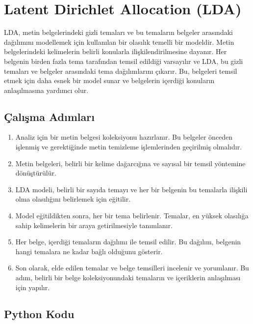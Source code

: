 \section{Latent Dirichlet Allocation (LDA)}
LDA, metin belgelerindeki gizli temaları ve bu temaların belgeler arasındaki dağılımını modellemek için kullanılan bir olasılık temelli bir modeldir.  Metin belgelerindeki kelimelerin belirli konularla ilişkilendirilmesine dayanır. Her belgenin birden fazla tema tarafından temsil edildiği varsayılır ve LDA, bu gizli temaları ve belgeler arasındaki tema dağılımlarını çıkarır. Bu, belgeleri temsil etmek için daha esnek bir model sunar ve belgelerin içerdiği konuların anlaşılmasına yardımcı olur.

\subsection{Çalışma Adımları}
\begin{enumerate}
    \item Analiz için bir metin belgesi koleksiyonu hazırlanır. Bu belgeler önceden işlenmiş ve gerektiğinde metin temizleme işlemlerinden geçirilmiş olmalıdır.
    \item Metin belgeleri, belirli bir kelime dağarcığına ve sayısal bir temsil yöntemine dönüştürülür.
    \item LDA modeli, belirli bir sayıda temayı ve her bir belgenin bu temalarla ilişkili olma olasılığını belirlemek için eğitilir. 
    \item Model eğitildikten sonra, her bir tema belirlenir. Temalar, en yüksek olasılığa sahip kelimelerin bir araya getirilmesiyle tanımlanır.
    \item Her belge, içerdiği temaların dağılımı ile temsil edilir. Bu dağılım, belgenin hangi temalara ne kadar bağlı olduğunu gösterir.
    \item Son olarak, elde edilen temalar ve belge temsilleri incelenir ve yorumlanır. Bu adım, belirli bir belge koleksiyonundaki temaların ve içeriklerin anlaşılması için yapılır.
\end{enumerate}

\subsection{Python Kodu}

